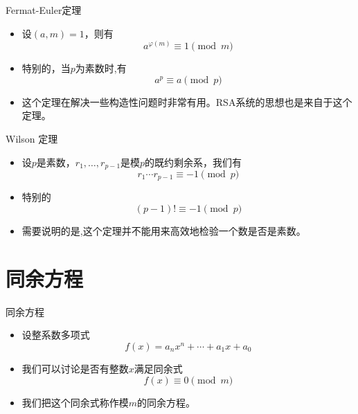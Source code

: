 \documentclass[dvipdfmx]{beamer}
\begin{document}
\begin{frame}{Fermat-Euler定理}
\begin{itemize}
\item 设$(a,m) = 1$，则有
\begin{displaymath}
a^{\varphi(m)}\equiv 1\pmod{m}
\end{displaymath}
\pause
\item 特别的，当$p$为素数时,有
\begin{displaymath}
a^p\equiv a\pmod{p}
\end{displaymath}
\item 这个定理在解决一些构造性问题时非常有用。RSA系统的思想也是来自于这个定理。
\end{itemize}
\end{frame}

\begin{frame}{Wilson 定理}
\begin{itemize}
\item 设$p$是素数，$r_1,\dotsc,r_{p−1}$是模$p$的既约剩余系，我们有
\begin{displaymath}
r_1\dotsm r_{p−1}\equiv −1\pmod{p}
\end{displaymath}
\pause
\item 特别的
\begin{displaymath}
(p − 1)!\equiv −1\pmod{p}
\end{displaymath}
\item 需要说明的是,这个定理并不能用来高效地检验一个数是否是素数。
\end{itemize}
\end{frame}

\section{同余方程}

\begin{frame}{同余方程}
\begin{itemize}
\item 设整系数多项式
\begin{displaymath}
f(x)=a_n x^n+\dotsb+a_1 x+a_0
\end{displaymath}
\item 我们可以讨论是否有整数$x$满足同余式
\begin{displaymath}
f(x)\equiv 0\pmod{m}
\end{displaymath}
\item 我们把这个同余式称作模$m$的同余方程。
\end{itemize}
\end{frame}
\end{document}
